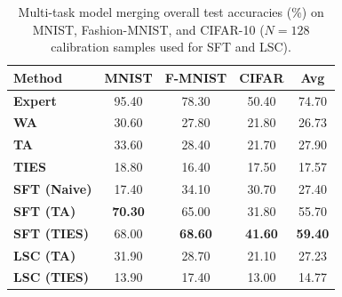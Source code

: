 \documentclass{article}
\theoremstyle{plain}
\theoremstyle{definition}
\theoremstyle{remark}
\begin{document}
\begin{table}[t]
  \caption{Multi-task model merging overall test accuracies (\%) on MNIST, Fashion-MNIST, and CIFAR-10 ($N=128$ calibration samples used for SFT and LSC).}
  \label{tab:overall_accuracies}
  \centering
  \scriptsize
  \setlength{\tabcolsep}{4.0pt}
  \renewcommand{\arraystretch}{0.85}
  \begin{tabular}{lcccc}
    \toprule
    \textbf{Method} & \textbf{MNIST} & \textbf{F-MNIST} & \textbf{CIFAR} & \textbf{Avg} \\
    \midrule
    \textbf{Expert} & 95.40 & 78.30 & 50.40 & 74.70 \\
    \midrule
    \textbf{WA} & 30.60 & 27.80 & 21.80 & 26.73 \\
    \textbf{TA} & 33.60 & 28.40 & 21.70 & 27.90 \\
    \textbf{TIES} & 18.80 & 16.40 & 17.50 & 17.57 \\
    \midrule
    \textbf{SFT (Naive)} & 17.40 & 34.10 & 30.70 & 27.40 \\
    \textbf{SFT (TA)} & \textbf{70.30} & 65.00 & 31.80 & 55.70 \\
    \textbf{SFT (TIES)} & 68.00 & \textbf{68.60} & \textbf{41.60} & \textbf{59.40} \\
    \midrule
    \textbf{LSC (TA)} & 31.90 & 28.70 & 21.10 & 27.23 \\
    \textbf{LSC (TIES)} & 13.90 & 17.40 & 13.00 & 14.77 \\
    \bottomrule
  \end{tabular}
\end{table}
\end{document}
